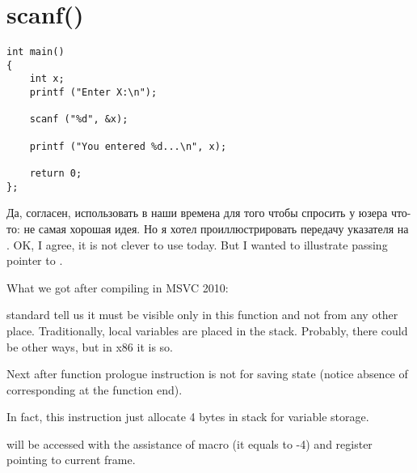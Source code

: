 ﻿%

\section{scanf()}


\begin{lstlisting}
int main() 
{
	int x;
	printf ("Enter X:\n");

	scanf ("%d", &x);

	printf ("You entered %d...\n", x);

	return 0;
};
\end{lstlisting}

\IFRU
{Да, согласен, использовать \scanf в наши времена для того чтобы спросить у юзера что-то: не самая хорошая идея.
Но я хотел проиллюстрировать передачу указателя на \Tint.}
{OK, I agree, it is not clever to use \scanf today. But I wanted to illustrate passing pointer to \Tint.}

{What we got after compiling in MSVC 2010:}




{\CCpp standard tell us it must be visible only in this function and not from any other place. 
Traditionally, local variables are placed in the stack. 
Probably, there could be other ways, but in x86 it is so.}

{Next after function prologue instruction  is not for saving \ECX state 
(notice absence of corresponding  at the function end).}

{In fact, this instruction just allocate 4 bytes in stack for  variable storage.} 

{ will be accessed with the assistance of  macro 
(it equals to -4) and \EBP register pointing to current frame.}

